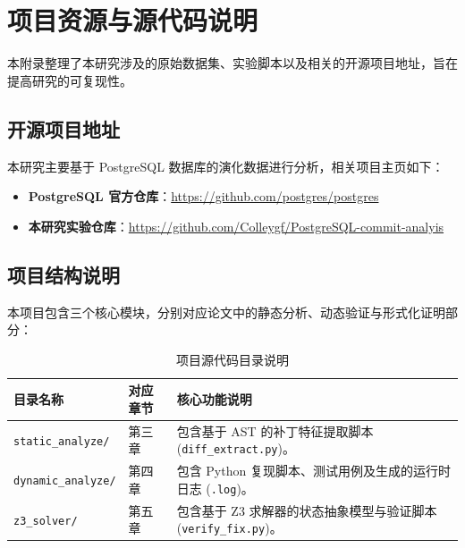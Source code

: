 \chapter{项目资源与源代码说明}

本附录整理了本研究涉及的原始数据集、实验脚本以及相关的开源项目地址，旨在提高研究的可复现性。

\section{开源项目地址}

本研究主要基于 PostgreSQL 数据库的演化数据进行分析，相关项目主页如下：

\begin{itemize}
    \item \textbf{PostgreSQL 官方仓库}：\url{https://github.com/postgres/postgres} 
    \item \textbf{本研究实验仓库}：\url{https://github.com/Colleygf/PostgreSQL-commit-analyis}
\end{itemize}

\section{项目结构说明}

本项目包含三个核心模块，分别对应论文中的静态分析、动态验证与形式化证明部分：

\begin{table}[htbp]
    \centering
    \caption{项目源代码目录说明}
    \begin{tabular}{llp{7cm}}
        \hline
        \textbf{目录名称} & \textbf{对应章节} & \textbf{核心功能说明} \\ \hline
        \texttt{static\_analyze/} & 第三章  & 包含基于 AST 的补丁特征提取脚本 (\texttt{diff\_extract.py})。  \\
        \texttt{dynamic\_analyze/} & 第四章  & 包含 Python 复现脚本、测试用例及生成的运行时日志 (\texttt{.log})。 \\
        \texttt{z3\_solver/} & 第五章  & 包含基于 Z3 求解器的状态抽象模型与验证脚本 (\texttt{verify\_fix.py})。  \\ \hline
    \end{tabular}
\end{table}
